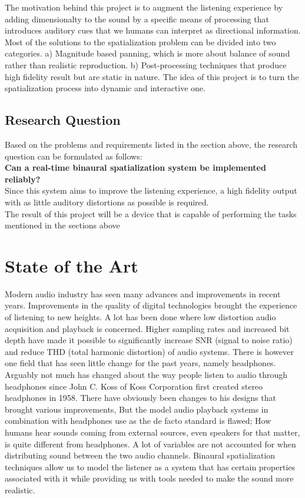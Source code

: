 \documentclass[a4paper,12pt,oneside]{article}
\begin{document}
The motivation behind this project is to augment the listening experience by adding dimensionalty to the sound by a specific means of processing that introduces auditory cues that we humans can interpret as directional information. Most of the solutions to the spatialization problem can be divided into two categories. a) Magnitude based panning, which is more about balance of sound rather than realistic reproduction. b) Post-processing techniques that produce high fidelity result but are static in nature. The idea of this project is to turn the spatialization process into dynamic and interactive one.

\subsection{Research Question}


Based on the problems and requirements listed in the section above, the research question can be formulated as follows:\\
\textbf{Can a real-time binaural spatialization system be implemented reliably?}\\
Since this system aims to improve the listening experience, a high fidelity output with as little auditory distortions as possible is required.\\
The result of this project will be a device that is capable of performing the tasks mentioned in the sections above

\section{State of the Art}
Modern audio industry has seen many advances and improvements in recent years. Improvements in the quality of digital technologies brought the experience of listening to new heights. A lot has been done where low distortion audio acquisition and playback is concerned. Higher sampling rates and increased bit depth have made it possible to significantly increase SNR (signal to noise ratio) and reduce THD (total harmonic distortion) of audio systems. There is however one field that has seen little change for the past years, namely headphones. Arguably not much has changed about the way people listen to audio through headphones since John C. Koss of Koss Corporation first created stereo headphones in 1958. There have obviously been changes to his designs that brought various improvements, But the model audio playback systems in combination with headphones use as the de facto standard is flawed; How humans hear sounds coming from external sources, even speakers for that matter, is quite different from headphones. A lot of variables are not accounted for when distributing sound between the two audio channels. Binaural spatialization techniques allow us to model the listener as a system that has certain properties associated with it while providing us with tools needed to make the sound more realistic.\\
\end{document}
